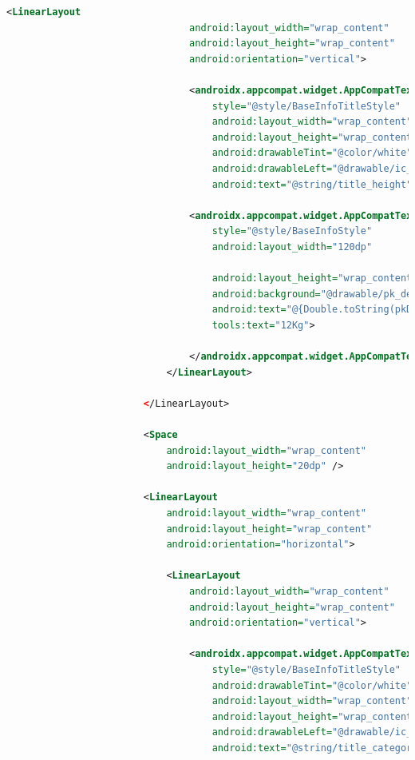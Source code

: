 \documentclass[a4paper, 12pt]{article}
\begin{document}
\begin{lstlisting}[caption={Pokemon Detail Layout.}, label={layout:pk_detail}, language=XML]
                            <LinearLayout
                                android:layout_width="wrap_content"
                                android:layout_height="wrap_content"
                                android:orientation="vertical">
    
                                <androidx.appcompat.widget.AppCompatTextView
                                    style="@style/BaseInfoTitleStyle"
                                    android:layout_width="wrap_content"
                                    android:layout_height="wrap_content"
                                    android:drawableTint="@color/white"
                                    android:drawableLeft="@drawable/ic_height"
                                    android:text="@string/title_height" />
    
                                <androidx.appcompat.widget.AppCompatTextView
                                    style="@style/BaseInfoStyle"
                                    android:layout_width="120dp"
    
                                    android:layout_height="wrap_content"
                                    android:background="@drawable/pk_detail_general_text"
                                    android:text="@{Double.toString(pkDetail.height)}"
                                    tools:text="12Kg">
    
                                </androidx.appcompat.widget.AppCompatTextView>
                            </LinearLayout>
    
                        </LinearLayout>
    
                        <Space
                            android:layout_width="wrap_content"
                            android:layout_height="20dp" />
    
                        <LinearLayout
                            android:layout_width="wrap_content"
                            android:layout_height="wrap_content"
                            android:orientation="horizontal">
    
                            <LinearLayout
                                android:layout_width="wrap_content"
                                android:layout_height="wrap_content"
                                android:orientation="vertical">
    
                                <androidx.appcompat.widget.AppCompatTextView
                                    style="@style/BaseInfoTitleStyle"
                                    android:drawableTint="@color/white"
                                    android:layout_width="wrap_content"
                                    android:layout_height="wrap_content"
                                    android:drawableLeft="@drawable/ic_category"
                                    android:text="@string/title_category" />
    

\end{lstlisting}
\end{document}
